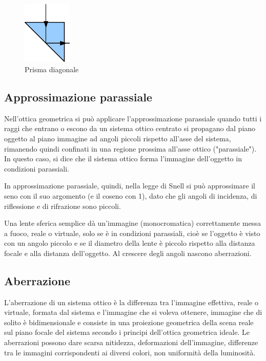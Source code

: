\begin{figure}

\centering
\includegraphics[height=3cm]{img/diagonale-prisma.pdf}

\caption{Prisma diagonale}
\label{fig:specchio-diagonale}
\end{figure}


\subsection{Approssimazione parassiale} 
Nell'ottica geometrica si può applicare l'approssimazione parassiale quando
tutti i raggi che entrano o escono da un sistema ottico centrato si propagano
dal piano oggetto al piano immagine ad angoli piccoli rispetto all'asse del
sistema, rimanendo quindi confinati in una regione prossima all’asse ottico
("parassiale"). In questo caso, si dice che il sistema ottico forma l’immagine
dell’oggetto in condizioni parassiali.

In approssimazione parassiale, quindi, nella legge di Snell si può
approssimare il seno con il suo argomento (e il coseno con 1), dato che gli
angoli di incidenza, di riflessione e di rifrazione sono piccoli.

Una lente sferica semplice dà un'immagine (monocromatica) correttamente messa
a fuoco, reale o virtuale, solo se è in condizioni parassiali, cioè se
l'oggetto è visto con un angolo piccolo e se il diametro della lente è piccolo
rispetto alla distanza focale e alla distanza dell'oggetto. Al crescere degli
angoli nascono aberrazioni.

\subsection{Aberrazione}
L'aberrazione di un sistema ottico è la differenza tra l'immagine effettiva,
reale o virtuale, formata dal sistema e l'immagine che si voleva ottenere,
immagine che di solito è bidimensionale e consiste in una proiezione
geometrica della scena reale sul piano focale del sistema secondo i principi
dell'ottica geometrica ideale. Le aberrazioni possono dare scarsa nitidezza,
deformazioni dell'immagine, differenze tra le immagini corrispondenti ai
diversi colori, non uniformità della luminosità.


